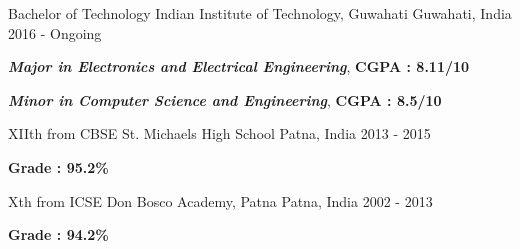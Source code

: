 

\begin{cventries}

  \cventry
    {Bachelor of Technology} %
    {Indian Institute of Technology, Guwahati} %
    {Guwahati, India} %
    { 2016 - Ongoing} %
    {
    \begin{cvitems} %
        \item {\textit{\textbf{Major in Electronics and Electrical Engineering}}, \textbf{CGPA : 8.11/10}}
        \item {\textit{\textbf{Minor in Computer Science and Engineering}}, \textbf{CGPA : 8.5/10}}
      \end{cvitems}
    }

  \cventry
    {XIIth from CBSE} %
    {St. Michaels High School} %
    {Patna, India} %
    { 2013 - 2015} %
    {    
    \begin{cvitems} %
        \item {\textbf{Grade : 95.2\%}}
        \end{cvitems}
    }
    
  \cventry
    {Xth from ICSE} %
    {Don Bosco Academy, Patna} %
    {Patna, India} %
    { 2002 - 2013} %
    {    \begin{cvitems} %
        \item {\textbf{Grade : 94.2\%}}
        \end{cvitems}}

\end{cventries}
